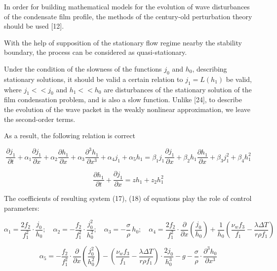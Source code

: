 \begin{multicols}{2}
In order for building mathematical models for the evolution of wave
disturbances of the condensate film profile, the methods of the
century-old perturbation theory should be used {[}12{]}.

With the help of supposition of the stationary flow regime nearby the
stability boundary, the process can be considered as quasi-stationary.

Under the condition of the slowness of the functions $j_0$ and $h_0$,
describing stationary solutions, it should be valid a certain relation
to $j_1=L(h_1)$ be valid, where $j_1<<j_0$ and $h_1<<h_0$ are
disturbances of the stationary solution of the film condensation
problem, and is also a slow function. Unlike {[}24{]}, to describe the
evolution of the wave packet in the weakly nonlinear approximation, we
leave the second-order terms.

As a result, the following relation is correct
\end{multicols}

\begin{equation}
\frac{\partial j_1}{\partial t}
+ \alpha_1 \frac{\partial j_1}{\partial x}
+ \alpha_2 \frac{\partial h_1}{\partial x}
+ \alpha_3 \frac{\partial^3 h_1}{\partial x^3}
+ \alpha_4 j_1
+ \alpha_5 h_1
=
\beta_1 j_1 \frac{\partial j_1}{\partial x}
+ \beta_2 h_1 \frac{\partial h_1}{\partial x}
+ \beta_3 j_1^2
+ \beta_4 h_1^2
\end{equation}

\begin{equation}
\frac{\partial h_1}{\partial t} + \frac{\partial j_1}{\partial x}
= \mathit{zh}_1 + z_2 h_1^2
\end{equation}

The coefficients of resulting system (17), (18) of equations play the
role of control parameters:

\begin{equation*}
\alpha_1 = \frac{2 f_2}{f_1^2} \cdot \frac{j_0}{h_0};\quad
\alpha_2 = - \frac{f_2}{f_1^2} \cdot \frac{j_0^2}{h_0^2};\quad
\alpha_3 = - \frac{\sigma}{\rho} \, h_0;\quad
\alpha_4 =
\frac{2 f_2}{f_1^2} \cdot \frac{\partial}{\partial x} \left( \frac{j_0}{h_0} \right)
+ \frac{1}{h_0} \left( \frac{\nu_w f_3}{f_1} - \frac{\lambda \Delta T}{r \rho f_1} \right)
\end{equation*}

\begin{equation}
\alpha_5 =
- \frac{f_2}{f_1^2} \cdot \frac{\partial}{\partial x} \left( \frac{j_0^2}{h_0^2} \right)
- \left( \frac{\nu_w f_3}{f_1} - \frac{\lambda \Delta T}{r \rho f_1} \right) \cdot \frac{2 j_0}{h_0^3}
- g
- \frac{\sigma}{\rho} \cdot \frac{\partial^3 h_0}{\partial x^3}
\end{equation}

